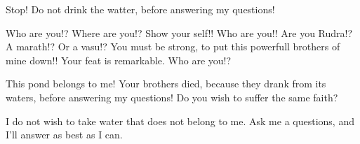 Stop!
Do not drink the watter, before answering my questions!

Who are you!?
Where are you!?
Show your self!!
Who are you!!
Are you Rudra!?
A marath!?
Or a vasu!?
You must be strong, to put this powerfull brothers of mine down!!
Your feat is remarkable.
Who are you!?

This pond belongs to me!
Your brothers died, because they drank from its waters, before answering my questions!
Do you wish to suffer the same faith?

I do not wish to take water that does not belong to me.
Ask me a questions, and I'll answer as best as I can.